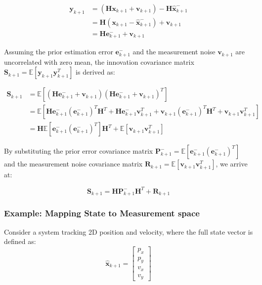 \documentclass{article}
\begin{document}
	\begin{align}
		\mathbf{y}_{k+1} &= \left(\mathbf{H} \mathbf{x}_{k+1} + \mathbf{v}_{k+1}\right) - \mathbf{H} \hat{\mathbf{x}}_{k+1}^- \nonumber \\
		&= \mathbf{H}\left(\mathbf{x}_{k+1} - \hat{\mathbf{x}}_{k+1}^-\right) + \mathbf{v}_{k+1} \nonumber \\
		&= \mathbf{H} \mathbf{e}_{k+1}^- + \mathbf{v}_{k+1}
		\label{eq:residual_error_form}
	\end{align}
	
	Assuming the prior estimation error $\mathbf{e}_{k+1}^-$ and the measurement noise $\mathbf{v}_{k+1}$ are uncorrelated with zero mean, the innovation covariance matrix $\mathbf{S}_{k+1} = \mathbb{E}\left[\mathbf{y}_{k+1} \mathbf{y}_{k+1}^T\right]$ is derived as:
	
	\begin{align}
		\mathbf{S}_{k+1} &= \mathbb{E}\left[ (\mathbf{H} \mathbf{e}_{k+1}^- + \mathbf{v}_{k+1}) (\mathbf{H} \mathbf{e}_{k+1}^- + \mathbf{v}_{k+1})^T \right] \nonumber \\
		&= \mathbb{E}\left[ \mathbf{H} \mathbf{e}_{k+1}^- (\mathbf{e}_{k+1}^-)^T \mathbf{H}^T + \mathbf{H} \mathbf{e}_{k+1}^- \mathbf{v}_{k+1}^T + \mathbf{v}_{k+1} (\mathbf{e}_{k+1}^-)^T \mathbf{H}^T + \mathbf{v}_{k+1} \mathbf{v}_{k+1}^T \right] \nonumber \\
		&= \mathbf{H} \mathbb{E}\left[ \mathbf{e}_{k+1}^- (\mathbf{e}_{k+1}^-)^T \right] \mathbf{H}^T + \mathbb{E}\left[ \mathbf{v}_{k+1} \mathbf{v}_{k+1}^T \right]
	\end{align}
	
	By substituting the prior error covariance matrix $\mathbf{P}_{k+1}^- = \mathbb{E}\left[ \mathbf{e}_{k+1}^- (\mathbf{e}_{k+1}^-)^T \right]$ and the measurement noise covariance matrix $\mathbf{R}_{k+1} = \mathbb{E}\left[ \mathbf{v}_{k+1} \mathbf{v}_{k+1}^T \right]$, we arrive at:
	
	\begin{equation}
		\mathbf{S}_{k+1} = \mathbf{H} \mathbf{P}_{k+1}^- \mathbf{H}^T + \mathbf{R}_{k+1}
		\label{eq:innovation_covariance}
	\end{equation}
	
	

	\subsubsection*{Example: Mapping State to Measurement space}
	
	Consider a system tracking 2D position and velocity, where the full state vector is defined as:
	\begin{equation*}
		\hat{\mathbf{x}}_{k+1} = 
		\begin{bmatrix} 
			p_x \\ p_y \\ v_x \\ v_y 
		\end{bmatrix}
	\end{equation*}
	
\end{document}
